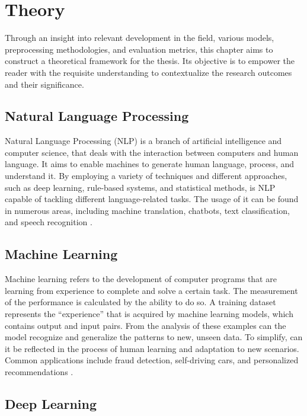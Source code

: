 \chapter{Theory}

Through an insight into relevant development in the field, various models, preprocessing methodologies, and evaluation metrics, this chapter aims to construct a theoretical framework for the thesis. Its objective is to empower the reader with the requisite understanding to contextualize the research outcomes and their significance.

\section{Natural Language Processing}

Natural Language Processing (NLP) is a branch of artificial intelligence and computer science, that deals with the interaction between computers and human language. It aims to enable machines to generate human language, process, and understand it. By employing a variety of techniques and different approaches, such as deep learning, rule-based systems, and statistical methods, is NLP capable of tackling different language-related tasks. The usage of it can be found in numerous areas, including machine translation, chatbots, text classification, and speech recognition \citep{helland_tackling_2023}.

\section{Machine Learning}

Machine learning refers to the development of computer programs that are learning from experience to complete and solve a certain task. The measurement of the performance is calculated by the ability to do so. A training dataset represents the “experience” that is acquired by machine learning models, which contains output and input pairs. From the analysis of these examples can the model recognize and generalize the patterns to new, unseen data. To simplify, can it be reflected in the process of human learning and adaptation to new scenarios. Common applications include fraud detection, self-driving cars, and personalized recommendations \citep{helland_tackling_2023}.

\section{Deep Learning}

